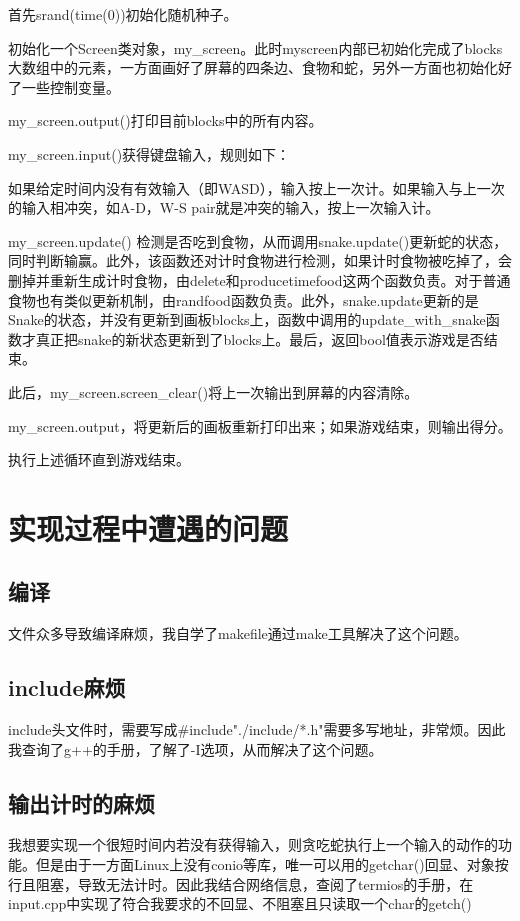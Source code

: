 \documentclass[UTF8]{ctexart}
\begin{document}
    首先srand(time(0))初始化随机种子。
    
    初始化一个Screen类对象，my\_screen。此时myscreen内部已初始化完成了blocks大数组中的元素，一方面画好了屏幕的四条边、食物和蛇，另外一方面也初始化好了一些控制变量。
    
    my\_screen.output()打印目前blocks中的所有内容。
    
    my\_screen.input()获得键盘输入，规则如下：

    如果给定时间内没有有效输入（即WASD），输入按上一次计。如果输入与上一次的输入相冲突，如A-D，W-S pair就是冲突的输入，按上一次输入计。

    my\_screen.update() 检测是否吃到食物，从而调用snake.update()更新蛇的状态，同时判断输赢。此外，该函数还对计时食物进行检测，如果计时食物被吃掉了，会删掉并重新生成计时食物，由delete和producetimefood这两个函数负责。对于普通食物也有类似更新机制，由randfood函数负责。此外，snake.update更新的是Snake的状态，并没有更新到画板blocks上，函数中调用的update\_with\_snake函数才真正把snake的新状态更新到了blocks上。最后，返回bool值表示游戏是否结束。

    此后，my\_screen.screen\_clear()将上一次输出到屏幕的内容清除。

    my\_screen.output，将更新后的画板重新打印出来；如果游戏结束，则输出得分。

    执行上述循环直到游戏结束。

\section{实现过程中遭遇的问题}
\subsection{编译}
文件众多导致编译麻烦，我自学了makefile通过make工具解决了这个问题。
\subsection{include麻烦}
include头文件时，需要写成\#include"./include/*.h"需要多写地址，非常烦。因此我查询了g++的手册，了解了-I选项，从而解决了这个问题。


\subsection{输出计时的麻烦}

    我想要实现一个很短时间内若没有获得输入，则贪吃蛇执行上一个输入的动作的功能。但是由于一方面Linux上没有conio等库，唯一可以用的getchar()回显、对象按行且阻塞，导致无法计时。因此我结合网络信息，查阅了termios的手册，在input.cpp中实现了符合我要求的不回显、不阻塞且只读取一个char的getch()
\end{document}

